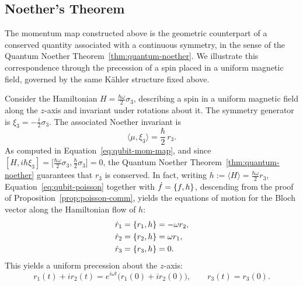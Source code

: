 \subsection*{Noether's Theorem}

The momentum map constructed above is the geometric counterpart of a conserved quantity associated with a continuous symmetry, in the sense of the Quantum Noether Theorem~\ref{thm:quantum-noether}. We illustrate this correspondence through the precession of a spin placed in a uniform magnetic field, governed by the same Kähler structure fixed above.

Consider the Hamiltonian $H=\frac{\hbar\omega}2\sigma_3$, describing a spin in a uniform magnetic field along the $z$-axis and invariant under rotations about it. The symmetry generator is $\xi_3=-\frac i2\sigma_3$. The associated Noether invariant is
\[
\langle\mu,\xi_3\rangle=\frac\hbar2\,r_3.
\]
As computed in Equation~\eqref{eq:qubit-mom-map}, and since $[H,i\hbar\xi_3]=\big[\frac{\hbar\omega}2\sigma_3,\frac\hbar2\sigma_3\big]=0$, the Quantum Noether Theorem~\ref{thm:quantum-noether} guarantees that $r_3$ is conserved. In fact, writing $h:=\langle H\rangle=\frac{\hbar\omega}2r_3$, Equation~\eqref{eq:qubit-poisson} together with $\dot f=\{f,h\}$, descending from the proof of Proposition~\ref{prop:poisson-comm}, yields the equations of motion for the Bloch vector along the Hamiltonian flow of $h$:
\begin{align*}
	\dot r_1 &= \{r_1,h\} = -\omega r_2, \\
	\dot r_2 &= \{r_2,h\} = \omega r_1, \\
	\dot r_3 &= \{r_3,h\} = 0.
\end{align*}
This yields a uniform precession about the $z$-axis:
\[
r_1(t)+ir_2(t)=e^{i\omega t}\big(r_1(0)+ir_2(0)\big), \qquad r_3(t)=r_3(0).
\]
